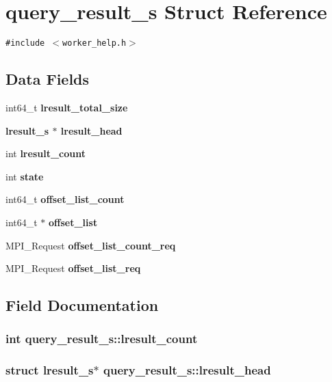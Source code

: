 \section{query\_\-result\_\-s Struct Reference}
\label{structquery__result__s}
{\tt \#include $<$worker\_\-help.h$>$}

\subsection*{Data Fields}
\begin{CompactItemize}
\item 
int64\_\-t \bf{lresult\_\-total\_\-size}
\item 
\bf{lresult\_\-s} $\ast$ \bf{lresult\_\-head}
\item 
int \bf{lresult\_\-count}
\item 
int \bf{state}
\item 
int64\_\-t \bf{offset\_\-list\_\-count}
\item 
int64\_\-t $\ast$ \bf{offset\_\-list}
\item 
MPI\_\-Request \bf{offset\_\-list\_\-count\_\-req}
\item 
MPI\_\-Request \bf{offset\_\-list\_\-req}
\end{CompactItemize}


\subsection{Field Documentation}
\subsubsection{\setlength{\rightskip}{0pt plus 5cm}int \bf{query\_\-result\_\-s::lresult\_\-count}}\label{structquery__result__s_2b98cc2f4eed5d5f6c2b76cf09923f2d}


\subsubsection{\setlength{\rightskip}{0pt plus 5cm}struct \bf{lresult\_\-s}$\ast$ \bf{query\_\-result\_\-s::lresult\_\-head}}\label{structquery__result__s_3889f6d09d87018ea2041972c01bfe90}


